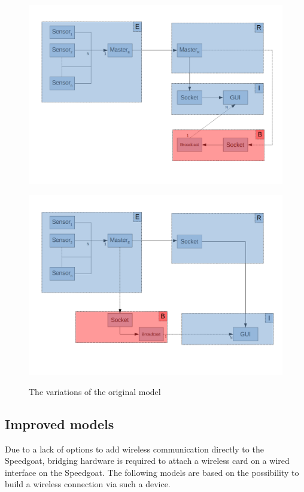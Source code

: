 \begin{figure}[H]
	\centering
	\begin{minipage}{.49\textwidth}
		\centering
		\includegraphics[width=\linewidth]{ERBI-Model-EtherCat}
		\label{fig:catmodel}
	\end{minipage}
	\begin{minipage}{.49\textwidth}
		\centering
		\includegraphics[width=\linewidth]{ERBI-Model-TCP}
		\label{fig:netmodel}
	\end{minipage}
	\caption{The variations of the original model}
	\label{fig:firstmodel}
\end{figure}

\subsection{Improved models}
Due to a lack of options to add wireless communication directly to the Speedgoat, bridging hardware is required to attach a wireless card on a wired interface on the Speedgoat. The following models are based on the possibility to build a wireless connection via such a device. 
